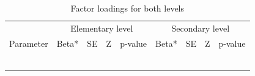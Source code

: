 \documentclass[
]{article}
\begin{document}
\begin{table}

\caption{\label{tab:unnamed-chunk-23}Factor loadings for both levels}
\centering
\begin{tabular}[t]{lrrrlrrrl}
\toprule
\multicolumn{1}{c}{ } & \multicolumn{4}{c}{Elementary level} & \multicolumn{4}{c}{Secondary level} \\
\cmidrule(l{3pt}r{3pt}){2-5} \cmidrule(l{3pt}r{3pt}){6-9}
Parameter & Beta* & SE & Z & p-value & Beta*  & SE  & Z  & p-value \\
\midrule
\textbf{\cellcolor[HTML]{E5E4E2}{EE→ITEM1}} & \textbf{\cellcolor[HTML]{E5E4E2}{0.776}} & \textbf{\cellcolor[HTML]{E5E4E2}{0.000}} & \textbf{\cellcolor[HTML]{E5E4E2}{NA}} & \textbf{\cellcolor[HTML]{E5E4E2}{NA}} & \textbf{\cellcolor[HTML]{E5E4E2}{0.756}} & \textbf{\cellcolor[HTML]{E5E4E2}{0.000}} & \textbf{\cellcolor[HTML]{E5E4E2}{NA}} & \textbf{\cellcolor[HTML]{E5E4E2}{NA}}\\
\cellcolor[HTML]{E5E4E2}{EE→ITEM2} & \cellcolor[HTML]{E5E4E2}{0.754} & \cellcolor[HTML]{E5E4E2}{0.032} & \cellcolor[HTML]{E5E4E2}{28.561} & \cellcolor[HTML]{E5E4E2}{<0.001} & \cellcolor[HTML]{E5E4E2}{0.736} & \cellcolor[HTML]{E5E4E2}{0.031} & \cellcolor[HTML]{E5E4E2}{30.236} & \cellcolor[HTML]{E5E4E2}{<0.001}\\
\cellcolor[HTML]{E5E4E2}{EE→ITEM3} & \cellcolor[HTML]{E5E4E2}{0.740} & \cellcolor[HTML]{E5E4E2}{0.045} & \cellcolor[HTML]{E5E4E2}{21.984} & \cellcolor[HTML]{E5E4E2}{<0.001} & \cellcolor[HTML]{E5E4E2}{0.722} & \cellcolor[HTML]{E5E4E2}{0.043} & \cellcolor[HTML]{E5E4E2}{24.030} & \cellcolor[HTML]{E5E4E2}{<0.001}\\
\cellcolor[HTML]{E5E4E2}{EE→ITEM6} & \cellcolor[HTML]{E5E4E2}{0.631} & \cellcolor[HTML]{E5E4E2}{0.051} & \cellcolor[HTML]{E5E4E2}{16.064} & \cellcolor[HTML]{E5E4E2}{<0.001} & \cellcolor[HTML]{E5E4E2}{0.626} & \cellcolor[HTML]{E5E4E2}{0.046} & \cellcolor[HTML]{E5E4E2}{18.669} & \cellcolor[HTML]{E5E4E2}{<0.001}\\
\cellcolor[HTML]{E5E4E2}{EE→ITEM8} & \cellcolor[HTML]{E5E4E2}{0.855} & \cellcolor[HTML]{E5E4E2}{0.042} & \cellcolor[HTML]{E5E4E2}{28.448} & \cellcolor[HTML]{E5E4E2}{<0.001} & \cellcolor[HTML]{E5E4E2}{0.833} & \cellcolor[HTML]{E5E4E2}{0.046} & \cellcolor[HTML]{E5E4E2}{25.968} & \cellcolor[HTML]{E5E4E2}{<0.001}\\
\cellcolor[HTML]{E5E4E2}{EE→ITEM13} & \cellcolor[HTML]{E5E4E2}{0.754} & \cellcolor[HTML]{E5E4E2}{0.045} & \cellcolor[HTML]{E5E4E2}{22.474} & \cellcolor[HTML]{E5E4E2}{<0.001} & \cellcolor[HTML]{E5E4E2}{0.762} & \cellcolor[HTML]{E5E4E2}{0.045} & \cellcolor[HTML]{E5E4E2}{23.619} & \cellcolor[HTML]{E5E4E2}{<0.001}\\

\end{tabular}
\end{table}
\end{document}
